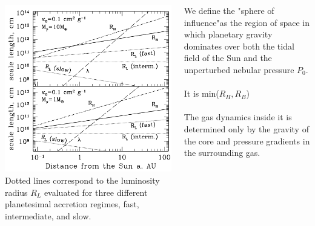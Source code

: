 \documentclass{beamer}
\begin{document}
\begin{frame}
\begin{columns}[t] 
\begin{column}{0.6\textwidth} 
\vspace{-0.5cm}
\includegraphics[width=\textwidth]{length_scale.png}
{\small Dotted lines correspond to the luminosity radius $R_L$ evaluated for three different planetesimal accretion regimes, fast, intermediate, and slow.}
\end{column} 
\begin{column}{0.4\textwidth}
We define the "sphere of influence"as the region of space in which planetary gravity dominates over both the tidal field of the Sun and the unperturbed nebular pressure $P_0$.\\
\hspace*{\fill} \\
{\Large It is min($R_H,R_B$)}\\
\hspace*{\fill} \\
The gas dynamics inside it is determined only by the gravity of the core and pressure gradients in the surrounding gas.
\end{column} 
\end{columns}
\end{frame}
\end{document}

